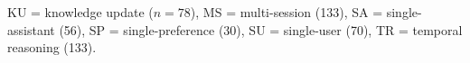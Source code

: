\begin{table}[t]
\begin{minipage}[t]{0.46\textwidth}
\vspace{2pt}
\raggedright KU = knowledge update ($n=78$), MS = multi-session (133), SA = single-assistant (56), SP = single-preference (30), SU = single-user (70), TR = temporal reasoning (133).\par
\end{minipage}
\end{table}
